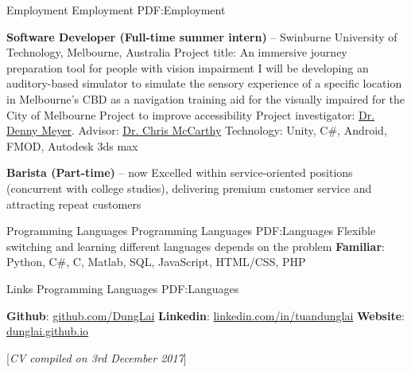 \documentclass[letterpaper,MMMyyyy,nonstopmode]{simpleresumecv}
\newcommand{\CVNote}{CV compiled on {3rd December 2017}}
\begin{document}
\begin{Body}
\Section 
{Employment}
{Employment}
{PDF:Employment}

\BulletItem
\textbf{Software Developer (Full-time summer intern)}
\hfill
{} --
\SubBulletItem Swinburne University of Technology, Melbourne, Australia
\SubBulletItem Project title: An immersive journey preparation tool for people with vision impairment
\SubBulletItem I will be developing an auditory-based simulator to simulate the sensory experience of a specific location in Melbourne's CBD as a navigation training aid for the visually impaired for the City of Melbourne Project to improve accessibility
\SubBulletItem Project investigator: \href{http://www.swinburne.edu.au/health-arts-design/staff/profile/index.php?id=dmeyer}{\color{blue}Dr. Denny Meyer}. Advisor: \href{https://www.swinburne.edu.au/science-engineering-technology/staff/profile/index.php?id=cdmccarthy}{\color{blue}Dr. Chris McCarthy}
\SubBulletItem Technology: Unity, C\#, Android, FMOD, Autodesk 3ds max

\BulletItem
\textbf{Barista (Part-time)}
\hfill
{} --
now
\SubBulletItem Excelled within service-oriented positions (concurrent with college studies), delivering premium customer service and attracting repeat customers

\Section 
{Programming Languages}
{Programming Languages}
{PDF:Languages}
\BulletItem Flexible switching and learning different languages depends on the problem
\BulletItem \textbf{Familiar}: Python, C\#, C, Matlab, SQL, JavaScript, HTML/CSS, PHP

\Section 
{Links}
{Programming Languages}
{PDF:Languages}

\BulletItem \textbf{Github}: \href{https://github.com/DungLai}{\color{blue}github.com/DungLai}
\BulletItem \textbf{Linkedin}: \href{https://www.linkedin.com/in/tuandunglai/}{\color{blue}linkedin.com/in/tuandunglai}
\BulletItem \textbf{Website}: \href{https://dunglai.github.io/}{\color{blue}dunglai.github.io}
\end{Body}



\BigGap
\UseNoteFont%
\null\hfill%
[\textit{\CVNote}]
\end{document}
